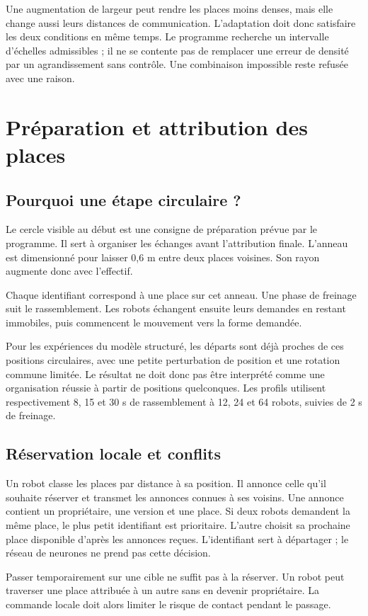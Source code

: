 Une augmentation de largeur peut rendre les places moins denses, mais elle change aussi leurs distances de communication. L'adaptation doit donc satisfaire les deux conditions en même temps. Le programme recherche un intervalle d'échelles admissibles ; il ne se contente pas de remplacer une erreur de densité par un agrandissement sans contrôle. Une combinaison impossible reste refusée avec une raison.

\section{Préparation et attribution des places}
\subsection{Pourquoi une étape circulaire ?}
Le cercle visible au début est une consigne de préparation prévue par le programme. Il sert à organiser les échanges avant l'attribution finale. L'anneau est dimensionné pour laisser 0,6 m entre deux places voisines. Son rayon augmente donc avec l'effectif.

Chaque identifiant correspond à une place sur cet anneau. Une phase de freinage suit le rassemblement. Les robots échangent ensuite leurs demandes en restant immobiles, puis commencent le mouvement vers la forme demandée.

Pour les expériences du modèle structuré, les départs sont déjà proches de ces positions circulaires, avec une petite perturbation de position et une rotation commune limitée. Le résultat ne doit donc pas être interprété comme une organisation réussie à partir de positions quelconques. Les profils utilisent respectivement 8, 15 et 30 s de rassemblement à 12, 24 et 64 robots, suivies de 2 s de freinage.

\subsection{Réservation locale et conflits}
Un robot classe les places par distance à sa position. Il annonce celle qu'il souhaite réserver et transmet les annonces connues à ses voisins. Une annonce contient un propriétaire, une version et une place. Si deux robots demandent la même place, le plus petit identifiant est prioritaire. L'autre choisit sa prochaine place disponible d'après les annonces reçues. L'identifiant sert à départager ; le réseau de neurones ne prend pas cette décision.

Passer temporairement sur une cible ne suffit pas à la réserver. Un robot peut traverser une place attribuée à un autre sans en devenir propriétaire. La commande locale doit alors limiter le risque de contact pendant le passage.

